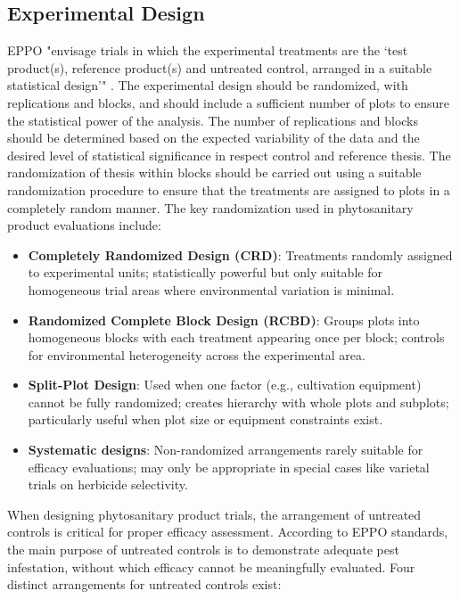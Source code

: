 \documentclass[12pt,a4paper,oneside]{report}
\begin{document}
\subsection{Experimental Design}

EPPO "envisage trials in which the experimental
treatments are the ‘test product(s), reference product(s) and
untreated control, arranged in a suitable statistical design’" \cite{EPPO_PP1_152}.
The experimental design should be randomized, with replications and blocks, and
should include a sufficient number of plots to ensure the statistical power of the
analysis. The number of replications and blocks should be determined based on the
expected variability of the data and the desired level of statistical significance
in respect control and reference thesis. The
randomization of thesis within blocks should be carried out using a suitable
randomization procedure to ensure that the treatments are assigned to plots in a
completely random manner. The key randomization used in phytosanitary product 
evaluations include:

\begin{itemize}
    \item \textbf{Completely Randomized Design (CRD)}: Treatments randomly assigned to 
          experimental units; statistically powerful but only suitable for homogeneous trial 
          areas where environmental variation is minimal.
          
    \item \textbf{Randomized Complete Block Design (RCBD)}: Groups plots into homogeneous 
          blocks with each treatment appearing once per block; controls for environmental 
          heterogeneity across the experimental area.
          
    \item \textbf{Split-Plot Design}: Used when one factor (e.g., cultivation equipment) 
          cannot be fully randomized; creates hierarchy with whole plots and subplots; 
          particularly useful when plot size or equipment constraints exist.
          
    \item \textbf{Systematic designs}: Non-randomized arrangements rarely suitable for 
          efficacy evaluations; may only be appropriate in special cases like varietal 
          trials on herbicide selectivity.
\end{itemize}

When designing phytosanitary product trials, the arrangement of untreated controls 
is critical for proper efficacy assessment. According to EPPO standards, the main 
purpose of untreated controls is to demonstrate adequate pest infestation, without 
which efficacy cannot be meaningfully evaluated. Four distinct arrangements for 
untreated controls exist:
\end{document}
